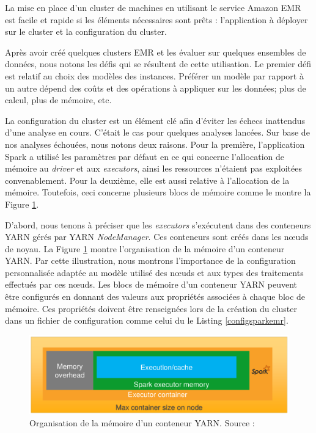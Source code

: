 La mise en place d'un cluster de machines en utilisant le service Amazon EMR est facile et rapide si les éléments nécessaires sont prêts : l'application à déployer sur le cluster et la configuration du cluster.

Après avoir créé quelques clusters EMR et les évaluer sur quelques ensembles de données, nous notons les défis qui se résultent de cette utilisation. 
Le premier défi est relatif au  choix des modèles des instances. Préférer un modèle par rapport à un autre dépend des coûts et   des opérations à appliquer sur les données; plus de calcul, plus de mémoire, etc.

La configuration du cluster est un élément clé afin d'éviter les échecs inattendus d'une analyse en cours. C'était le cas pour  quelques analyses lancées. Sur base de nos  analyses échouées, nous notons deux  raisons. Pour la première,  l'application Spark a  utilisé les paramètres par défaut en ce qui concerne l'allocation de mémoire au  \textit{driver} et aux \textit{executors}, ainsi les ressources n'étaient pas exploitées convenablement.  Pour la deuxième, elle est aussi relative  à l'allocation de la mémoire. Toutefois, ceci concerne plusieurs blocs de mémoire comme le montre la Figure 	\ref{fig:spark-executoronyarn}.


D'abord, nous tenons à préciser que les \textit{executors} s'exécutent dans des conteneurs YARN gérés par YARN \textit{NodeManager}. Ces conteneurs sont créés dans les n\oe{}uds de noyau. La Figure 	\ref{fig:spark-executoronyarn} montre l'organisation de la mémoire d'un conteneur YARN. Par cette illustration, nous montrons l'importance de la configuration personnalisée adaptée au modèle utilisé  des n\oe{}uds et aux types des traitements effectués par ces n\oe{}uds. 
Les blocs de mémoire d'un conteneur YARN   peuvent être configurés en donnant des valeurs aux propriétés associées à chaque bloc de mémoire. Ces propriétés doivent être renseignées lors de la création du cluster  dans un fichier de configuration  comme celui du le Listing \ref{configsparkemr}.

\begin{figure}[h]
	\centering
	\includegraphics[width=\linewidth]{illustrations/spark-executoronyarn}
	\caption{Organisation de la mémoire d'un conteneur YARN. Source :  \cite{best-practices-emr}}
	\label{fig:spark-executoronyarn}
\end{figure}



